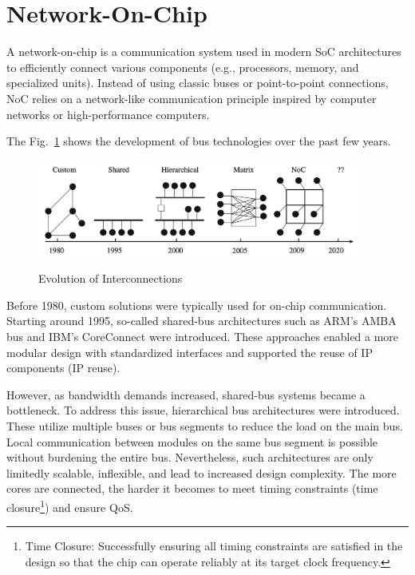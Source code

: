 \section{Network-On-Chip}

A network-on-chip is a communication system used in modern \ac{SoC} architectures to efficiently connect various components (e.g., processors, memory, and specialized units). Instead of using classic buses or point-to-point connections, \ac{NoC} relies on a network-like communication principle inspired by computer networks or high-performance computers.~\cite{serpanos_architecture_2011}

The Fig.~\ref{fig:Evolution_of_Interconnection} shows the development of bus technologies over the past few years.
\begin{figure}[htbp]
    \centering
    \includegraphics[width=0.95\textwidth]{img/Evolution of On-Chip communication interconnect.png}
    \caption{Evolution of Interconnections}\cite{abderazek_multicore_2013}\label{fig:Evolution_of_Interconnection}
\end{figure}

Before 1980, custom solutions were typically used for on-chip communication. Starting around 1995, so-called shared-bus architectures such as ARM’s AMBA bus \cite{arm_amba_nodate} and IBM’s CoreConnect\cite{international_business_machines_corporation_coreconnect_1999} were introduced. These approaches enabled a more modular design with standardized interfaces and supported the reuse of IP components (IP reuse).


However, as bandwidth demands increased, shared-bus systems became a bottleneck. To address this issue, hierarchical bus architectures were introduced. These utilize multiple buses or bus segments to reduce the load on the main bus. Local communication between modules on the same bus segment is possible without burdening the entire bus. Nevertheless, such architectures are only limitedly scalable, inflexible, and lead to increased design complexity. The more cores are connected, the harder it becomes to meet timing constraints (time closure\footnote{Time Closure: Successfully ensuring all timing constraints are satisfied in the design so that the chip can operate reliably at its target clock frequency.}) and ensure \ac{QoS}.


